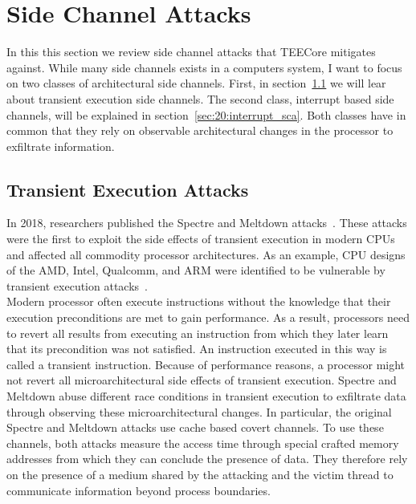 \section{Side Channel Attacks}
\label{sec:20:attacks}
In this this section we review side channel attacks that TEECore mitigates
against. While many side channels exists in a computers system, I want to focus
on two classes of architectural side channels. First, in
section~\ref{sec:20:transientattacks} we will lear about transient execution
side channels. The second class, interrupt based side channels, will be
explained in section~\ref{sec:20:interrupt_sca}. Both classes have in common
that they rely on observable architectural changes in the processor to
exfiltrate information.

\subsection{Transient Execution Attacks}
\label{sec:20:transientattacks}
In 2018, researchers published the Spectre and Meltdown
attacks~\cite{kocher_spectre_2020, lipp_meltdown_2020}. These attacks were the
first to exploit the side effects of transient execution in modern CPUs and
affected all commodity processor architectures. As an example, CPU designs of
the AMD, Intel, Qualcomm, and ARM were identified to be vulnerable by transient
execution attacks~\cite{wikner2022retbleed,moghimi_downfall_2023,ragab_ghostrace_2024}.\\

Modern processor often execute instructions without the knowledge that their
execution preconditions are met to gain performance. As a result, processors
need to revert all results from executing an instruction from which they later
learn that its precondition was not satisfied. An instruction executed in this
way is called a transient instruction. Because of performance reasons, a
processor might not revert all microarchitectural side effects of transient
execution. Spectre and Meltdown abuse different race conditions in transient
execution to exfiltrate data through observing these microarchitectural changes.
In particular, the original Spectre and Meltdown attacks use cache based covert
channels. To use these channels, both attacks measure the access time through
special crafted memory addresses from which they can conclude the presence of
data. They therefore rely on the presence of a medium shared by the attacking
and the victim thread to communicate information beyond process boundaries. \\

